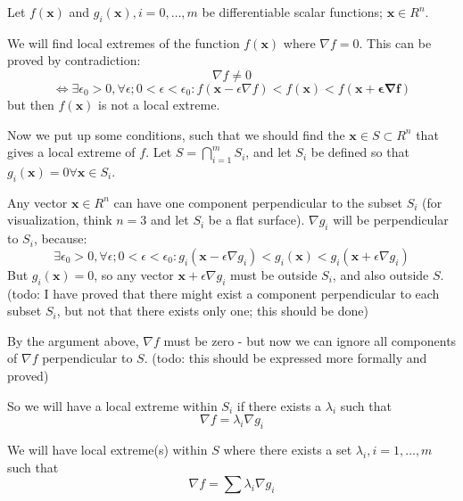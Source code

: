 \documentclass[12pt]{article}
\begin{document}
Let $f(\mathbf{x})$ and $g_i(\mathbf{x}), i=0,{\ldots},m$ 
be differentiable scalar functions; $\mathbf{x} \in R^n$.

We will find local extremes of the function $f(\mathbf{x})$ where
$\nabla f=0$.  This can be proved by contradiction:
\[ \nabla f \neq 0 \]
\[ \Leftrightarrow \exists \epsilon_0 > 0, \forall
\epsilon; 0<\epsilon<\epsilon_0: f(\mathbf{x}-\epsilon \nabla f) < f(\mathbf{x}) < f(\mathbf{x+\epsilon \nabla f})
\]
but then $f(\mathbf{x})$ is not a local extreme.

Now we put up some conditions, such that we should find the $\mathbf{x}
\in S \subset R^n$ that gives a local extreme of $f$.  Let $S=\bigcap_{i=1}^m S_i$, and
let $S_i$ be defined so that $g_i(\mathbf{x})=0 \forall \mathbf{x} \in S_i$. 

Any vector $\mathbf{x} \in R^n$ can have one component perpendicular to
the subset $S_i$ (for visualization, think $n=3$ and let
$S_i$ be a flat surface).  $\nabla g_i$ will be perpendicular to
$S_i$, because:
\[ \exists \epsilon_0>0,  \forall \epsilon; 0<\epsilon<\epsilon_0:
g_i(\mathbf{x}-\epsilon \nabla g_i)<g_i(\mathbf{x})<
g_i(\mathbf{x}+\epsilon \nabla g_i) \]
But $g_i(\mathbf{x})=0$, so any vector $\mathbf{x}+\epsilon \nabla
g_i$ must be outside $S_i$, and also outside $S$.
(todo: I have proved that there might exist a component perpendicular to each subset $S_i$, but not that there exists only one; this should be done)


By the argument above, $\nabla f$ must be zero - but now we can ignore
all components of $\nabla f$ perpendicular to $S$. (todo: this should be expressed more formally and proved)

So we will have a local extreme within $S_i$ if there exists a
$\lambda_i$ such that 
\[ \nabla f = \lambda_i \nabla g_i \] 

We will have local extreme(s) within $S$ where there exists a set
$\lambda_i, i=1,{\ldots},m$
such that 
\[ \nabla f = \sum \lambda_i \nabla g_i \]
\end{document}
